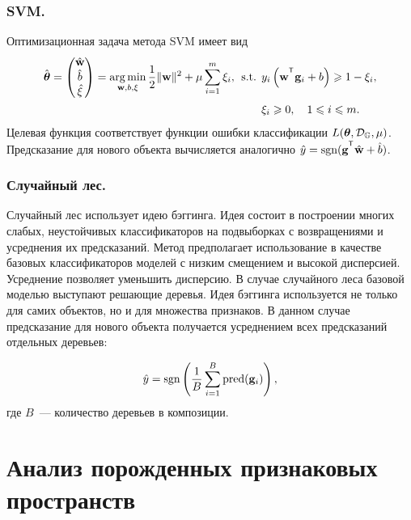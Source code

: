 \subsubsection{SVM.}
Оптимизационная задача метода SVM имеет вид
\begin{align*}
	\hat{\btheta}  = \begin{pmatrix}
	\hat{\mathbf{w}} \\ \hat{b} \\ \hat{\mathbf{\xi}}
	\end{pmatrix}= \argmin_{\mathbf{w}, b, \mathbf{\xi}}  \frac{1}{2} \|\mathbf{w}\|^2 + \mu \sum_{i=1}^{m} \xi_i,\:\:
	\mbox{s.t.} \:\: &y_i \left(\mathbf{w}^{\T} \mathbf{g}_i + b\right) \geq 1 - \xi_i,\\
	&\xi_i \geq 0, \quad 1 \leq i \leq m.
\end{align*}
Целевая функция соответствует функции ошибки классификации $L(\boldsymbol{\theta}, \mathcal{D}_\mathbb{G}, \mu)$.
Предсказание для нового объекта вычисляется аналогично $
\hat{y} = \sgn (\mathbf{g}^{\T} \hat{\mathbf{w}} + \hat{b})$.

\subsubsection{Случайный лес.}
Случайный лес использует идею бэггинга. 
Идея состоит в построении многих слабых, неустойчивых классификаторов на подвыборках с возвращениями и усреднения их предсказаний.
Метод предполагает использование в качестве базовых классификаторов моделей с низким смещением и высокой дисперсией. 
Усреднение позволяет уменьшить дисперсию.
В случае случайного леса базовой моделью выступают решающие деревья. Идея бэггинга используется не только для самих объектов, но и для множества признаков.
В данном случае предсказание для нового объекта получается усреднением всех предсказаний отдельных деревьев:

\begin{equation*}
	\hat{y} = \operatorname{\mathop{sgn}} \left(\frac{1}{B} \sum_{i=1}^{B} \text{pred}(\mathbf{g}_i) \right),
\end{equation*}
где $B$~--- количество деревьев в композиции.


\section{Анализ порожденных признаковых пространств}
\label{sec:ch6:exp_feature_generation}

